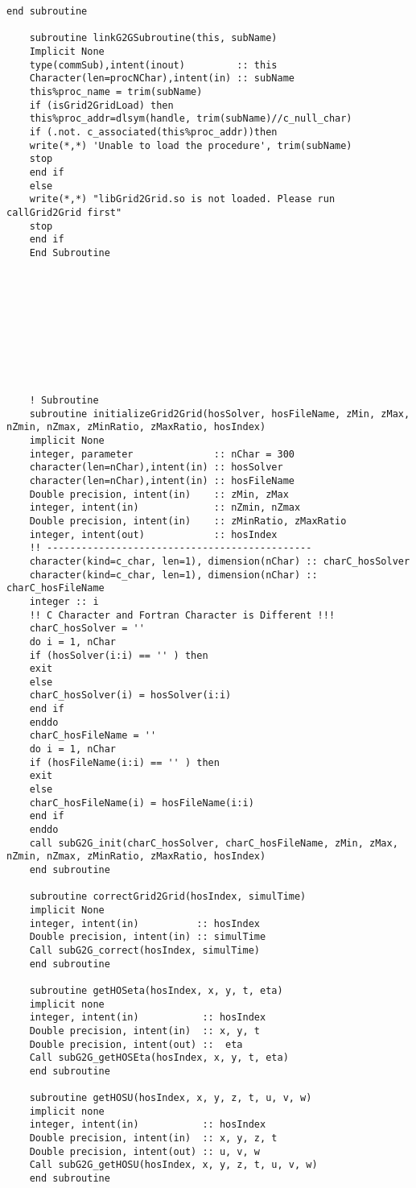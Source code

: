\begin{lstlisting}[language={[95]Fortran}]
	end subroutine
	
	subroutine linkG2GSubroutine(this, subName)
	Implicit None
	type(commSub),intent(inout)         :: this
	Character(len=procNChar),intent(in) :: subName
	this%proc_name = trim(subName)
	if (isGrid2GridLoad) then
	this%proc_addr=dlsym(handle, trim(subName)//c_null_char)
	if (.not. c_associated(this%proc_addr))then
	write(*,*) 'Unable to load the procedure', trim(subName)
	stop
	end if
	else
	write(*,*) "libGrid2Grid.so is not loaded. Please run callGrid2Grid first"
	stop
	end if
	End Subroutine
	
	
	
	
	
	
	
	
	
	
	! Subroutine
	subroutine initializeGrid2Grid(hosSolver, hosFileName, zMin, zMax, nZmin, nZmax, zMinRatio, zMaxRatio, hosIndex)
	implicit None
	integer, parameter              :: nChar = 300
	character(len=nChar),intent(in) :: hosSolver
	character(len=nChar),intent(in) :: hosFileName
	Double precision, intent(in)    :: zMin, zMax
	integer, intent(in)             :: nZmin, nZmax
	Double precision, intent(in)    :: zMinRatio, zMaxRatio
	integer, intent(out)            :: hosIndex
	!! ----------------------------------------------
	character(kind=c_char, len=1), dimension(nChar) :: charC_hosSolver
	character(kind=c_char, len=1), dimension(nChar) :: charC_hosFileName
	integer :: i
	!! C Character and Fortran Character is Different !!!
	charC_hosSolver = ''
	do i = 1, nChar
	if (hosSolver(i:i) == '' ) then
	exit
	else
	charC_hosSolver(i) = hosSolver(i:i)
	end if
	enddo
	charC_hosFileName = ''
	do i = 1, nChar
	if (hosFileName(i:i) == '' ) then
	exit
	else
	charC_hosFileName(i) = hosFileName(i:i)
	end if
	enddo
	call subG2G_init(charC_hosSolver, charC_hosFileName, zMin, zMax, nZmin, nZmax, zMinRatio, zMaxRatio, hosIndex)
	end subroutine
	
	subroutine correctGrid2Grid(hosIndex, simulTime)
	implicit None
	integer, intent(in)          :: hosIndex
	Double precision, intent(in) :: simulTime
	Call subG2G_correct(hosIndex, simulTime)
	end subroutine
	
	subroutine getHOSeta(hosIndex, x, y, t, eta)
	implicit none
	integer, intent(in)           :: hosIndex
	Double precision, intent(in)  :: x, y, t
	Double precision, intent(out) ::  eta
	Call subG2G_getHOSEta(hosIndex, x, y, t, eta)
	end subroutine
	
	subroutine getHOSU(hosIndex, x, y, z, t, u, v, w)
	implicit none
	integer, intent(in)           :: hosIndex
	Double precision, intent(in)  :: x, y, z, t
	Double precision, intent(out) :: u, v, w
	Call subG2G_getHOSU(hosIndex, x, y, z, t, u, v, w)
	end subroutine
	

\end{lstlisting}
